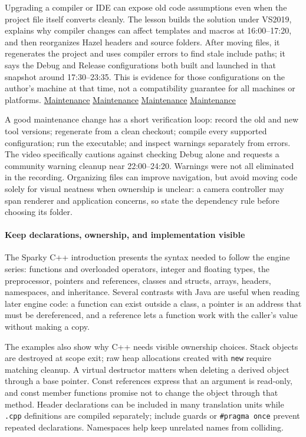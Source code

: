 Upgrading a compiler or IDE can expose old code assumptions even when the project file itself converts cleanly. The lesson builds the solution under VS2019, explains why compiler changes can affect templates and macros at 16:00--17:20, and then reorganizes Hazel headers and source folders. After moving files, it regenerates the project and uses compiler errors to find stale include paths; it says the Debug and Release configurations both built and launched in that snapshot around 17:30--23:35. This is evidence for those configurations on the author's machine at that time, not a compatibility guarantee for all machines or platforms. \href{https://www.youtube.com/watch?v=e9uTV44oOiw&t=960s}{Maintenance} \href{https://www.youtube.com/watch?v=e9uTV44oOiw&t=1050s}{Maintenance} \href{https://www.youtube.com/watch?v=e9uTV44oOiw&t=1320s}{Maintenance} \href{https://www.youtube.com/watch?v=e9uTV44oOiw&t=1410s}{Maintenance}

A good maintenance change has a short verification loop: record the old and new tool versions; regenerate from a clean checkout; compile every supported configuration; run the executable; and inspect warnings separately from errors. The video specifically cautions against checking Debug alone and requests a community warning cleanup near 22:00--24:20. Warnings were not all eliminated in the recording. Organizing files can improve navigation, but avoid moving code solely for visual neatness when ownership is unclear: a camera controller may span renderer and application concerns, so state the dependency rule before choosing its folder.

\paragraph{Keep declarations, ownership, and implementation visible}\label{keep-declarations-ownership-and-implementation-visible}

The Sparky C++ introduction presents the syntax needed to follow the engine series: functions and overloaded operators, integer and floating types, the preprocessor, pointers and references, classes and structs, arrays, headers, namespaces, and inheritance. Several contrasts with Java are useful when reading later engine code: a function can exist outside a class, a pointer is an address that must be dereferenced, and a reference lets a function work with the caller's value without making a copy.

The examples also show why C++ needs visible ownership choices. Stack objects are destroyed at scope exit; raw heap allocations created with \texttt{new} require matching cleanup. A virtual destructor matters when deleting a derived object through a base pointer. Const references express that an argument is read-only, and const member functions promise not to change the object through that method. Header declarations can be included in many translation units while \texttt{.cpp} definitions are compiled separately; include guards or \texttt{\#pragma\ once} prevent repeated declarations. Namespaces help keep unrelated names from colliding.

